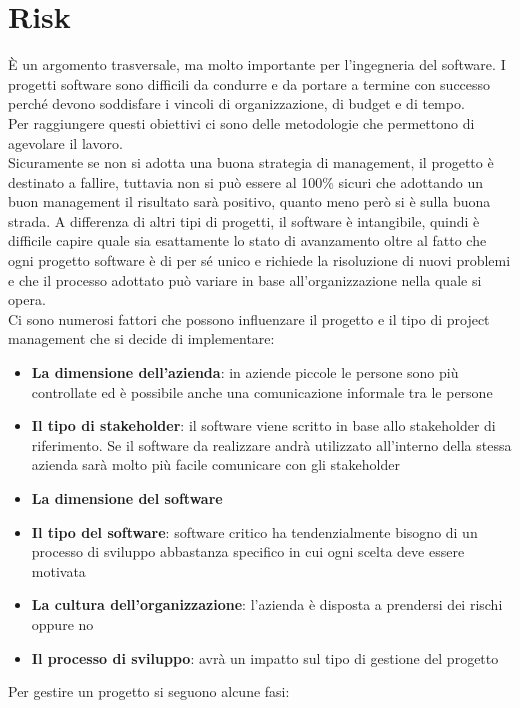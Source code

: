 \section{Risk}
\label{sec:09_risk}
È un argomento trasversale, ma molto importante per l'ingegneria del software.
I progetti software sono difficili da condurre e da portare a termine con successo perché devono soddisfare i vincoli di organizzazione, di budget e di tempo.\\
Per raggiungere questi obiettivi ci sono delle metodologie che permettono di agevolare il lavoro.\\
Sicuramente se non si adotta una buona strategia di management, il progetto è destinato a fallire, tuttavia non si può essere al 100\% sicuri che adottando un buon management il risultato sarà positivo, quanto meno però si è sulla buona strada.
A differenza di altri tipi di progetti, il software è intangibile, quindi è difficile capire quale sia esattamente lo stato di avanzamento oltre al fatto che ogni progetto software è di per sé unico e richiede la risoluzione di nuovi problemi e che il processo adottato può variare in base all'organizzazione nella quale si opera.\\
Ci sono numerosi fattori che possono influenzare il progetto e il tipo di project management che si decide di implementare:
\begin{itemize}[noitemsep]
    \item \textbf{La dimensione dell'azienda}: in aziende piccole le persone sono più controllate ed è possibile anche una comunicazione informale tra le persone
    \item \textbf{Il tipo di stakeholder}: il software viene scritto in base allo stakeholder di riferimento. Se il software da realizzare andrà utilizzato all'interno della stessa azienda sarà molto più facile comunicare con gli stakeholder
    \item \textbf{La dimensione del software}
    \item \textbf{Il tipo del software}: software critico ha tendenzialmente bisogno di un processo di sviluppo abbastanza specifico in cui ogni scelta deve essere motivata
    \item \textbf{La cultura dell'organizzazione}: l'azienda è disposta a prendersi dei rischi oppure no
    \item \textbf{Il processo di sviluppo}: avrà un impatto sul tipo di gestione del progetto
\end{itemize}
Per gestire un progetto si seguono alcune fasi:
